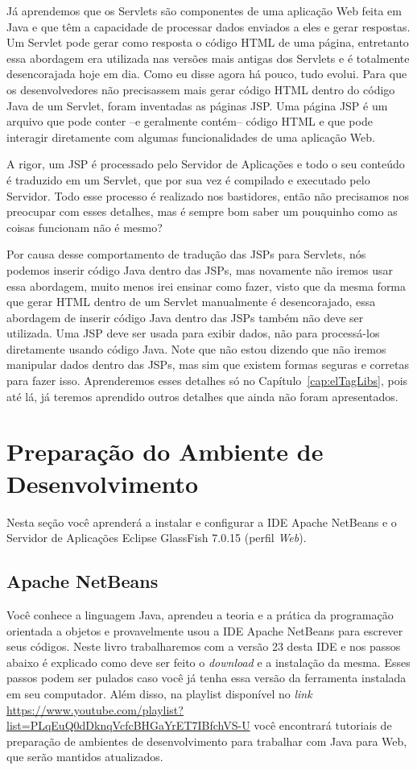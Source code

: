 Já aprendemos que os Servlets são componentes de uma aplicação Web feita em Java e que têm a capacidade de processar dados enviados a eles e gerar respostas. Um Servlet pode gerar como resposta o código HTML de uma página, entretanto essa abordagem era utilizada nas versões mais antigas dos Servlets e é totalmente desencorajada hoje em dia. Como eu disse agora há pouco, tudo evolui. Para que os desenvolvedores não precisassem mais gerar código HTML dentro do código Java de um Servlet, foram inventadas as páginas JSP. Uma página JSP é um arquivo que pode conter –e geralmente contém– código HTML e que pode interagir diretamente com algumas funcionalidades de uma aplicação Web.

A rigor, um JSP é processado pelo Servidor de Aplicações e todo o seu conteúdo é traduzido em um Servlet, que por sua vez é compilado e executado pelo Servidor. Todo esse processo é realizado nos bastidores, então não precisamos nos preocupar com esses detalhes, mas é sempre bom saber um pouquinho como as coisas funcionam não é mesmo?

Por causa desse comportamento de tradução das JSPs para Servlets, nós podemos inserir código Java dentro das JSPs, mas novamente não iremos usar essa abordagem, muito menos irei ensinar como fazer, visto que da mesma forma que gerar HTML dentro de um Servlet manualmente é desencorajado, essa abordagem de inserir código Java dentro das JSPs também não deve ser utilizada. Uma JSP deve ser usada para exibir dados, não para processá-los diretamente usando código Java. Note que não estou dizendo que não iremos manipular dados dentro das JSPs, mas sim que existem formas seguras e corretas para fazer isso. Aprenderemos esses detalhes só no Capítulo~\ref{cap:elTagLibs}, pois até lá, já teremos aprendido outros detalhes que ainda não foram apresentados.


\section{Preparação do Ambiente de Desenvolvimento}

Nesta seção você aprenderá a instalar e configurar a IDE Apache NetBeans e o Servidor de Aplicações Eclipse GlassFish 7.0.15 (perfil \textit{Web}).


\subsection{Apache NetBeans}

Você conhece a linguagem Java, aprendeu a teoria e a prática da programação orientada a objetos e provavelmente usou a IDE Apache NetBeans para escrever seus códigos. Neste livro trabalharemos com a versão 23 desta IDE e nos passos abaixo é explicado como deve ser feito o \textit{download} e a instalação da mesma. Esses passos podem ser pulados caso você já tenha essa versão da ferramenta instalada em seu computador. Além disso, na playlist disponível no \textit{link} \url{https://www.youtube.com/playlist?list=PLqEuQ0dDknqVcfcBHGaYrET7IBfchVS-U} você encontrará tutoriais de preparação de ambientes de desenvolvimento para trabalhar com Java para Web, que serão mantidos atualizados.

